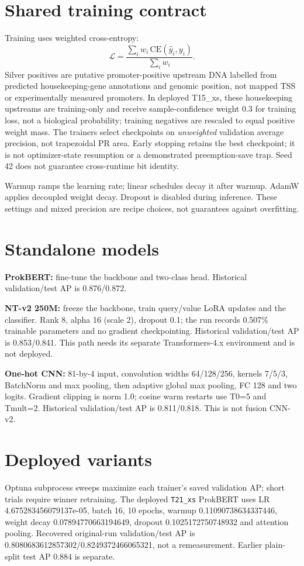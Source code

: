 \documentclass{article}
\begin{document}
\section{Shared training contract}
Training uses weighted cross-entropy:
\begin{equation}
\mathcal{L}=\frac{\sum_i w_i\,\mathrm{CE}(\hat y_i,y_i)}{\sum_i w_i}.
\end{equation}
Silver positives are putative promoter-positive upstream DNA labelled from predicted housekeeping-gene annotations and genomic position, not mapped TSS or experimentally measured promoters. In deployed T15\_xs, these housekeeping upstreams are training-only and receive sample-confidence weight 0.3 for training loss, not a biological probability; training negatives are rescaled to equal positive weight mass. The trainers select checkpoints on \emph{unweighted} validation average precision, not trapezoidal PR area. Early stopping retains the best checkpoint; it is not optimizer-state resumption or a demonstrated preemption-save trap. Seed 42 does not guarantee cross-runtime bit identity.

Warmup ramps the learning rate; linear schedules decay it after warmup. AdamW applies decoupled weight decay. Dropout is disabled during inference. These settings and mixed precision are recipe choices, not guarantees against overfitting.

\section{Standalone models}
\textbf{ProkBERT:} fine-tune the backbone and two-class head. Historical validation/test AP is 0.876/0.872.

\textbf{NT-v2 250M:} freeze the backbone, train query/value LoRA updates and the classifier. Rank 8, alpha 16 (scale 2), dropout 0.1; the run records 0.507\% trainable parameters and no gradient checkpointing. Historical validation/test AP is 0.853/0.841. This path needs its separate Transformers-4.x environment and is not deployed.

\textbf{One-hot CNN:} 81-by-4 input, convolution widths 64/128/256, kernels 7/5/3, BatchNorm and max pooling, then adaptive global max pooling, FC 128 and two logits. Gradient clipping is norm 1.0; cosine warm restarts use T0=5 and Tmult=2. Historical validation/test AP is 0.811/0.818. This is not fusion CNN-v2.

\section{Deployed variants}
Optuna subprocess sweeps maximize each trainer's saved validation AP; short trials require winner retraining. The deployed \texttt{T21\_xs} ProkBERT uses LR 4.675283456079137e-05, batch 16, 10 epochs, warmup 0.11090738634337446, weight decay 0.07894770663194649, dropout 0.1025172750748932 and attention pooling. Recovered original-run validation/test AP is 0.8080683612857302/0.8249372466065321, not a remeasurement. Earlier plain-split test AP 0.884 is separate.
\end{document}
